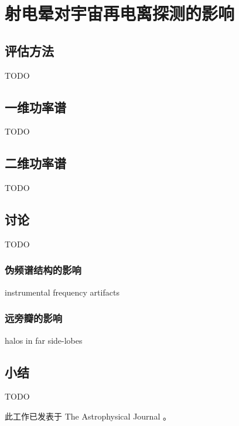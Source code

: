 
\chapter{射电晕对宇宙再电离探测的影响}
\label{chap:halo}

\section{评估方法}

TODO


\section{一维功率谱}

TODO


\section{二维功率谱}

TODO


\section{讨论}

TODO

\subsection{伪频谱结构的影响}

instrumental frequency artifacts

\subsection{远旁瓣的影响}

halos in far side-lobes


\section{小结}

TODO

此工作已发表于 The Astrophysical Journal \cite{li2018halo}。


